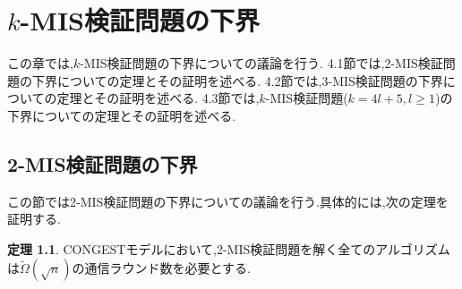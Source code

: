 \documentclass[12pt]{thesis}
\newcommand{\CONGEST}{\textsf{CONGEST}}
\theoremstyle{definition}
\newtheorem{theorem}{定理}[chapter]
\begin{document}
\chapter{$k$-MIS検証問題の下界}
この章では,$k$-MIS検証問題の下界についての議論を行う.
4.1節では,2-MIS検証問題の下界についての定理とその証明を述べる.
4.2節では,3-MIS検証問題の下界についての定理とその証明を述べる.
4.3節では,$k$-MIS検証問題($k = 4l + 5, l \geq 1$)の下界についての定理とその証明を述べる.

\section{2-MIS検証問題の下界}

この節では2-MIS検証問題の下界についての議論を行う.具体的には,次の定理を証明する. 
\begin{theorem}
{\CONGEST}モデルにおいて,2-MIS検証問題を解く全てのアルゴリズムは$\tilde{\Omega} (\sqrt{n})$の通信ラウンド数を必要とする.
\end{theorem}
\end{document}
